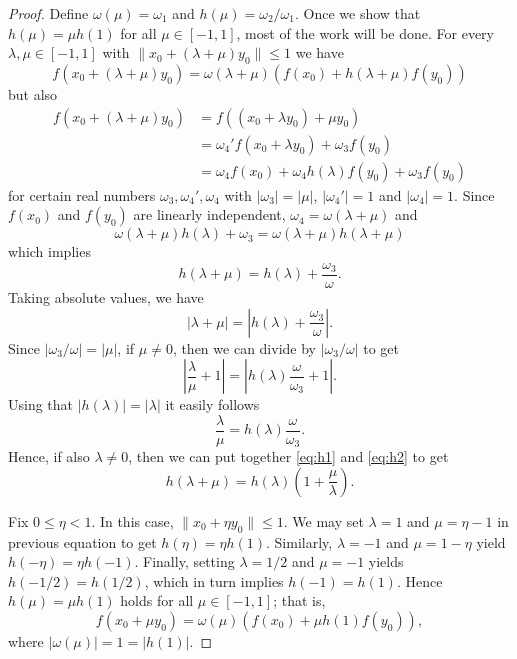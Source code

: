 \documentclass{memo-l}
\theoremstyle{definition}
\theoremstyle{remark}
\numberwithin{section}{chapter}
\numberwithin{equation}{chapter}
\begin{document}
\begin{proof}
    Define $\omega (\mu)=\omega _1$ and $h(\mu )=\omega _2/\omega _1$.
    Once we show that $h(\mu )=\mu h(1)$ for all $\mu \in [-1,1]$, most of the work will be done.
    For every $\lambda ,\mu \in [-1,1]$ with $\|x_0+(\lambda +\mu
    )y_0\|\le 1$ we have
    \[
    f(x_0+(\lambda +\mu )y_0)=\omega (\lambda +\mu )(f(x_0)+h(\lambda +\mu
    )f(y_0))
    \]
    but also
    \begin{align*}
        f(x_0+(\lambda +\mu )y_0)&=f( (x_0+\lambda y_0) + \mu y_0)\\
                     &=\omega _4'f(x_0+\lambda y_0)+\omega _3 f(y_0)\\
                     &=\omega _4f(x_0)+\omega _4h(\lambda
                     )f(y_0)+\omega _3f(y_0)
    \end{align*}
    for certain real numbers $\omega _3,\omega _4',\omega _4$ with
    $|\omega _3|=|\mu |$, $|\omega _4'|=1$ and $|\omega _4|=1$. Since
    $f(x_0)$ and $f(y_0)$ are linearly independent, $\omega _4=\omega
    (\lambda +\mu )$ and
    \[
    \omega (\lambda +\mu )h(\lambda )+\omega _3=\omega (\lambda +\mu ) h(\lambda +\mu )
    \]
    which implies
    \begin{equation}\label{eq:h1}
    h(\lambda +\mu )=h(\lambda )+ \frac{\omega _3}{\omega}.
    \end{equation}
    Taking absolute values, we have
    \[
    |\lambda +\mu |=\left| h(\lambda )+\frac{\omega _3}{\omega } \right|.
    \]
    Since $|\omega _3/\omega |=|\mu |$, if $\mu \neq
    0$, then we can divide by $|\omega _3/\omega |$ to get
    \[
    \left| \frac{\lambda }{\mu }+1 \right| =\left| h(\lambda
    )\frac{\omega }{\omega _3} +1\right|.
    \]
    Using that $|h(\lambda )|=|\lambda |$ it easily follows
    \begin{equation}\label{eq:h2}
    \frac{\lambda }{\mu }=h(\lambda )\frac{\omega }{\omega _3}.
    \end{equation}
    Hence, if also $\lambda \neq 0$, then we can put together
    \eqref{eq:h1} and \eqref{eq:h2} to get
    \[
    h(\lambda +\mu )=h(\lambda ) \left( 1+\frac{\mu }{\lambda }
    \right).
    \]

    Fix $0\le \eta<1$. In this case, $\|x_0+\eta y_0\|\le 1$. We may set $\lambda =1$ and $\mu =\eta -1$ in
    previous equation to get $h(\eta )=\eta h(1)$. Similarly, $\lambda
    =-1$ and $\mu =1-\eta $ yield $h(-\eta )=\eta h(-1)$. Finally,
    setting $\lambda =1/2$ and $\mu =-1$ yields $h(-1/2)=h(1/2)$,
    which in turn implies $h(-1)=h(1)$. Hence $h(\mu)=\mu  h(1)$
    holds for all $\mu  \in [-1,1]$; that is,
    \[
    f(x_0+\mu  y_0)=\omega (\mu  )(f(x_0)+\mu h(1) f(y_0)),
    \]
    where $|\omega (\mu )|=1=|h(1)|$.


\end{proof}
\end{document}
